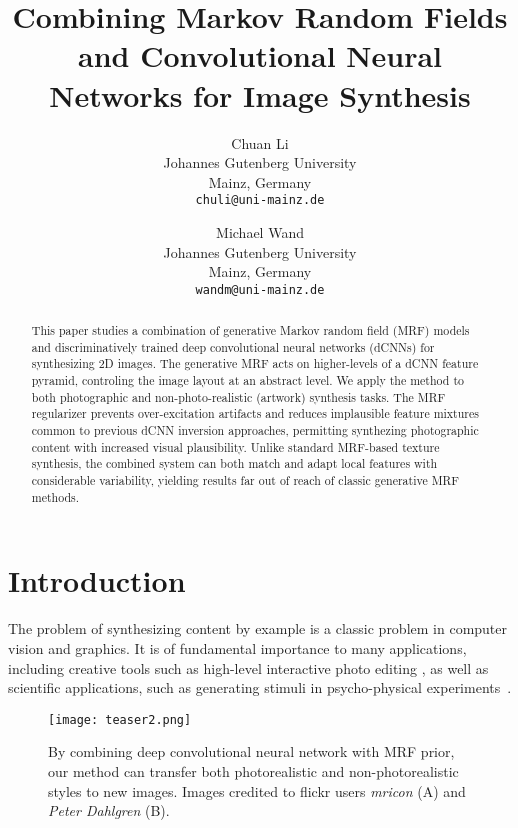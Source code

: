 \documentclass[10pt,twocolumn,letterpaper]{article}
\begin{document}
\title{Combining Markov Random Fields and Convolutional Neural Networks for Image Synthesis}

\author{Chuan Li\\
Johannes Gutenberg University\\
Mainz, Germany\\
{\tt\small chuli@uni-mainz.de}
\and
Michael Wand\\
Johannes Gutenberg University\\
Mainz, Germany\\
{\tt\small wandm@uni-mainz.de}
}

\maketitle

\begin{abstract}
This paper studies a combination of generative Markov random field (MRF) models and discriminatively trained deep convolutional neural networks (dCNNs) for synthesizing 2D images. The generative MRF acts on higher-levels of a dCNN feature pyramid, controling the image layout at an abstract level.
We apply the method to both photographic and non-photo-realistic (artwork) synthesis tasks. The MRF regularizer prevents over-excitation artifacts and reduces implausible feature mixtures common to previous dCNN inversion approaches, permitting synthezing photographic content with increased visual plausibility. Unlike standard MRF-based texture synthesis, the combined system can both match and adapt local features with considerable variability, yielding results far out of reach of classic generative MRF methods.
\end{abstract}

\section{Introduction}

The problem of synthesizing content by example is a classic problem in computer vision and graphics. It is of fundamental importance to many applications, including creative tools such as high-level interactive photo editing \cite{Agarwala04,Barnes09,Hertzmann01}, as well as scientific applications, such as generating stimuli in psycho-physical experiments~\cite{Gatys2015b}.

\begin{figure}
	\centering
		\texttt{[image: teaser2.png]}
		\caption{By combining deep convolutional neural network with MRF prior, our method can transfer both photorealistic and non-photorealistic styles to new images. Images credited to flickr users \emph{mricon} (A) and \emph{Peter Dahlgren} (B).}
	\label{fig:teaser}
\end{figure}
\end{document}
